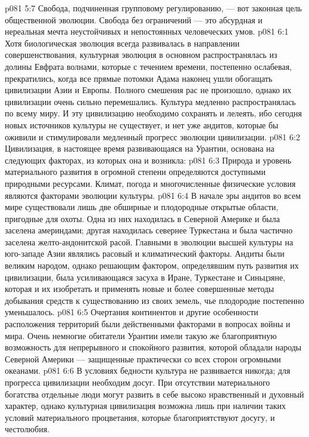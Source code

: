 \vs p081 5:7 Свобода, подчиненная групповому регулированию, --- вот законная цель общественной эволюции. Свобода без ограничений --- это абсурдная и нереальная мечта неустойчивых и непостоянных человеческих умов.
\vs p081 6:1 Хотя биологическая эволюция всегда развивалась в направлении совершенствования, культурная эволюция в основном распространялась из долины Евфрата волнами, которые с течением времени, постепенно ослабевая, прекратились, когда все прямые потомки Адама наконец ушли обогащать цивилизации Азии и Европы. Полного смешения рас не произошло, однако их цивилизации очень сильно перемешались. Культура медленно распространялась по всему миру. И эту цивилизацию необходимо сохранять и лелеять, ибо сегодня новых источников культуры не существует, и нет уже андитов, которые бы оживили и стимулировали медленный прогресс эволюции цивилизации.
\vs p081 6:2 \pc Цивилизация, в настоящее время развивающаяся на Урантии, основана на следующих факторах, из которых она и возникла:
\vs p081 6:3 \bibnobreakspace {} Природа и уровень материального развития в огромной степени определяются доступными природными ресурсами. Климат, погода и многочисленные физические условия являются факторами эволюции культуры.
\vs p081 6:4 В начале эры андитов во всем мире существовали лишь две обширные и плодородные открытые области, пригодные для охоты. Одна из них находилась в Северной Америке и была заселена америндами; другая находилась севернее Туркестана и была частично заселена желто\hyp{}андонитской расой. Главными в эволюции высшей культуры на юго\hyp{}западе Азии являлись расовый и климатический факторы. Андиты были великим народом, однако решающим фактором, определявшим путь развития их цивилизации, была усиливающаяся засуха в Иране, Туркестане и Синьцзяне, которая и  их изобретать и применять новые и более совершенные методы добывания средств к существованию из своих земель, чье плодородие постепенно уменьшалось.
\vs p081 6:5 Очертания континентов и другие особенности расположения территорий были действенными факторами в вопросах войны и мира. Очень немногие обитатели Урантии имели такую же благоприятную возможность для непрерывного и спокойного развития, которой обладали народы Северной Америки --- защищенные практически со всех сторон огромными океанами.
\vs p081 6:6 \bibnobreakspace {} В условиях бедности культура не развивается никогда; для прогресса цивилизации необходим досуг. При отсутствии материального богатства отдельные люди могут развить в себе высоко нравственный и духовный характер, однако культурная цивилизация возможна лишь при наличии таких условий материального процветания, которые благоприятствуют досугу, и честолюбия.
